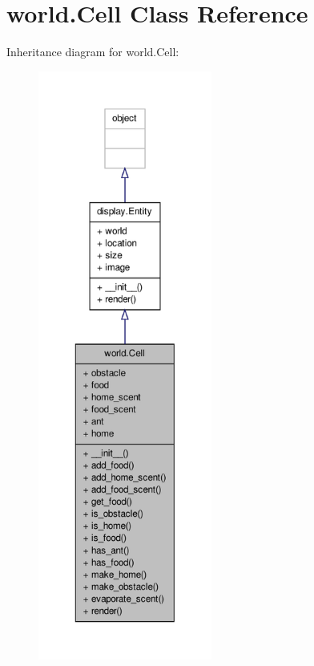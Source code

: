 \hypertarget{classworld_1_1Cell}{\section{world.\+Cell Class Reference}
\label{classworld_1_1Cell}
}


Inheritance diagram for world.\+Cell\+:\nopagebreak
\begin{figure}[H]
\begin{center}
\leavevmode
\includegraphics[height=550pt]{classworld_1_1Cell__inherit__graph}
\end{center}
\end{figure}


